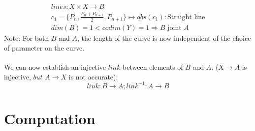 \documentclass{article}
\begin{document}
\begin{align}
lines: X \times X \rightarrow B\\
c_{1}=\{P_{n},\frac{P_{n}+P_{n+1}}{2},P_{n+1}\} \mapsto qbs(c_{1}): \text{Straight line}\\
dim(B)=1<codim(Y)=1 \Rightarrow B \text{ joint } A
\end{align}
Note: For both $B$ and $A$, the length of the curve is now independent of the choice of parameter on the curve. ~\cite[]{Taimanov}\\\\
We can now establish an injective $link$ between elements of $B$ and $A$. ($X \rightarrow A$ is injective, $but$ $A \rightarrow X$ is not accurate):
\begin{equation}
link: B \rightarrow A; link^{-1}: A \rightarrow B
\end{equation}
\section{Computation}

\iffalse
\begin{equation} 
\forall u,v \in V :
d(u,v) = 
\begin{cases}
0,  u=v \\
1,  u \neq v 
\end{cases}
\end{equation}
\fi

\printbibliography
\end{document}
